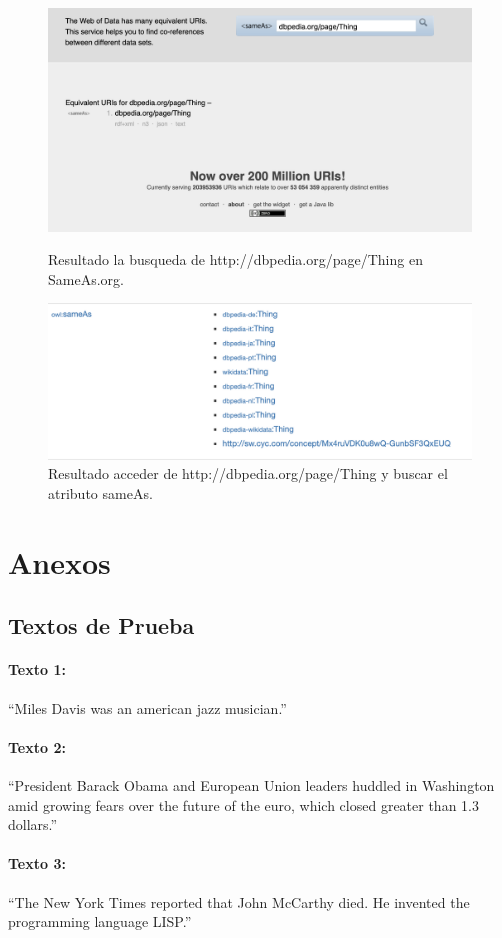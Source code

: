 \documentclass[spanish]{llncs}   %
\begin{document}
\begin{figure}[!htb]
    \includegraphics[width=\textwidth]{resources/SameAsWeb.png}
    \caption{Resultado la busqueda de http://dbpedia.org/page/Thing en SameAs.org.}
    \label{Fig.2}
    \includegraphics[width=\textwidth]{resources/DBPediaSameAs.png}
    \caption{Resultado acceder de http://dbpedia.org/page/Thing y buscar el atributo sameAs.}
    \label{Fig.3}
\end{figure}

\section{Anexos}

\subsection{Textos de Prueba}\label{Textos}

\paragraph{Texto 1:}
“Miles Davis was an american jazz musician.”

\paragraph{Texto 2:}
“President Barack Obama and European Union leaders huddled in Washington amid growing fears over the future of the euro, which closed greater than 1.3 dollars.”

\paragraph{Texto 3:}
“The New York Times reported that John McCarthy died. He invented the programming language LISP.”
\end{document}
